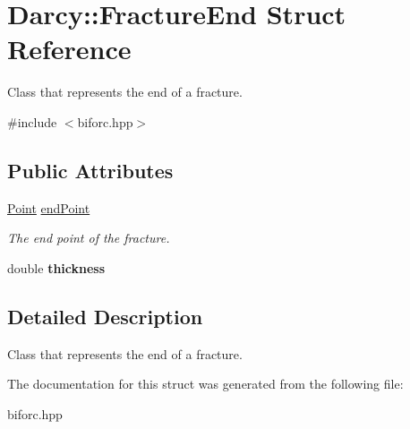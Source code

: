 \hypertarget{structDarcy_1_1FractureEnd}{\section{Darcy\-:\-:Fracture\-End Struct Reference}
\label{structDarcy_1_1FractureEnd}
}


Class that represents the end of a fracture.  




{\ttfamily \#include $<$biforc.\-hpp$>$}

\subsection*{Public Attributes}
\begin{DoxyCompactItemize}
\item 
\hypertarget{structDarcy_1_1FractureEnd_ab17d3e55554a58054635e029c6ed657d}{\hyperlink{classGeometry_1_1Point}{Point} \hyperlink{structDarcy_1_1FractureEnd_ab17d3e55554a58054635e029c6ed657d}{end\-Point}}\label{structDarcy_1_1FractureEnd_ab17d3e55554a58054635e029c6ed657d}

\begin{DoxyCompactList}\small\item\em The end point of the fracture. \end{DoxyCompactList}\item 
\hypertarget{structDarcy_1_1FractureEnd_aade17e0cf9132e52c715142fa0e032f7}{double {\bfseries thickness}}\label{structDarcy_1_1FractureEnd_aade17e0cf9132e52c715142fa0e032f7}

\end{DoxyCompactItemize}


\subsection{Detailed Description}
Class that represents the end of a fracture. 

The documentation for this struct was generated from the following file\-:\begin{DoxyCompactItemize}
\item 
biforc.\-hpp\end{DoxyCompactItemize}
